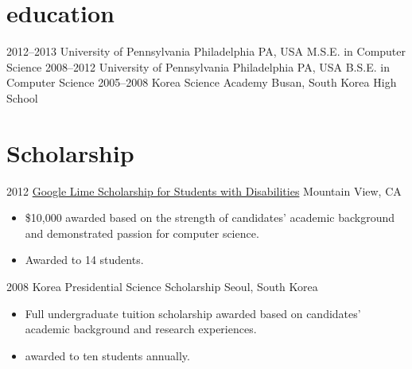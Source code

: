 \documentclass[]{patyoon-cv}
\begin{document}
\section{education}

\begin{entrylist}
  \entry
  {2012–2013}
  {University of Pennsylvania}
  {Philadelphia PA, USA}
  {M.S.E. in Computer Science}
  \entry
  {2008–2012}
  {University of Pennsylvania}
  {Philadelphia PA, USA}
  {B.S.E. in Computer Science}
  \entry
  {2005–2008}
  {Korea Science Academy}
  {Busan, South Korea}
  {High School}
\end{entrylist}



\section{Scholarship}

\begin{entrylist}
  \entry
  {2012}
  {\href{http://www.limeconnect.com/opportunities/page/google-lime-scholarship-program}
    {Google Lime Scholarship for Students with Disabilities}}
  {Mountain View, CA}
  {\begin{itemize}
    \item \$10,000 awarded based on the strength of candidates' academic background and demonstrated passion for computer science.
    \item Awarded to 14 students.
    \end{itemize}
  }
  \entry
  {2008}
  {Korea Presidential Science Scholarship}
  {Seoul, South Korea}
  {\begin{itemize}
    \item Full undergraduate tuition scholarship awarded based on candidates' academic background and research experiences.
    \item awarded to ten students annually.
    \end{itemize}
  }
\end{entrylist}
\end{document}
